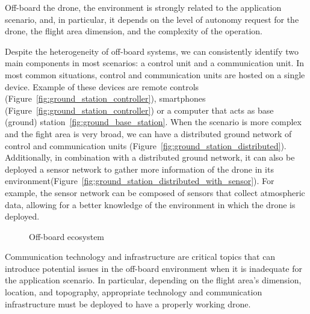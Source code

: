 Off-board the drone, the environment is strongly related to the application scenario, and, in particular, it depends on the level of 
autonomy request for the drone, the flight area dimension, and the complexity of the operation.

Despite the heterogeneity of off-board systems, we can consistently identify two main components in most scenarios: a control unit and a communication unit. 
In most common situations, control and communication units are hosted on a single device.
Example of these devices are remote controls (Figure~\ref{fig:ground_station_controller}), smartphones (Figure~\ref{fig:ground_station_controller})
or a computer that acts as base (ground) station~\ref{fig:ground_base_station}.
When the scenario is more complex and the fight area is very broad, 
we can have a distributed ground network of control and communication units (Figure~\ref{fig:ground_station_distributed}).
Additionally, in combination with a distributed ground network, it can also be deployed a sensor network to gather more
information of the drone in its environment(Figure~\ref{fig:ground_station_distributed_with_sensor}). 
For example, the sensor network can be composed of sensors that collect atmospheric data, allowing for a better knowledge of the environment
in which the drone is deployed. 

\begin{figure}[h]
    \centering
    \quad
    \quad
    \quad
    \quad
    \caption[Off-board ecosystem]{Off-board ecosystem}\label{fig:off_board_ecosystem}
\end{figure}

Communication technology and infrastructure are critical topics that can introduce potential issues 
in the off-board environment when it is inadequate for the application scenario.
In particular, depending on the flight area's dimension, location, and topography, appropriate technology and communication infrastructure must be deployed to have a properly working drone.

